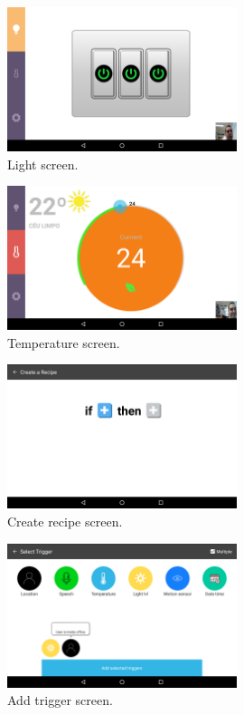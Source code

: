 %


\begin{figure}[H]
\centering
\includegraphics[width=0.6\textwidth]{Figures/screen_lights}
\caption{Light screen.}
\label{screen_lights}
\end{figure}


\begin{figure}[H]
\centering
\includegraphics[width=0.6\textwidth]{Figures/screen_temperature}
\caption{Temperature screen.}
\label{screen_temperature}
\end{figure}



\begin{figure}[H]
\centering
\includegraphics[width=0.6\textwidth]{Figures/create_recipe}
\caption{Create recipe screen.}
\label{create_recipe}
\end{figure}

\begin{figure}[H]
\centering
\includegraphics[width=0.6\textwidth]{Figures/screen_trigger}
\caption{Add trigger screen.}
\label{screen_triggers}
\end{figure}

